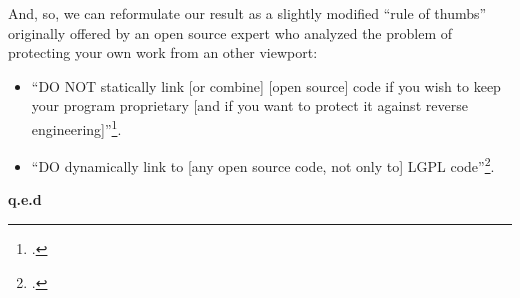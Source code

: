 And, so, we can reformulate our result as a slightly modified \enquote{rule of
thumbs} originally offered by an open source expert who analyzed the problem of
protecting your own work from an other viewport:

\begin{itemize}
  \item \enquote{DO NOT statically link [or combine] [open source] code if you
  wish to keep your program proprietary [and if you want to protect it against reverse
  engineering]}\footcite[cf.][6; bracketed text KR.]{Ilardi2010a}.
  \item \enquote{DO dynamically link to [any open source code, not only to] LGPL
  code}\footcite[cf.][6; bracketed text KR.]{Ilardi2010a}.
\end{itemize}

\textbf{\textsf{q.e.d}}


